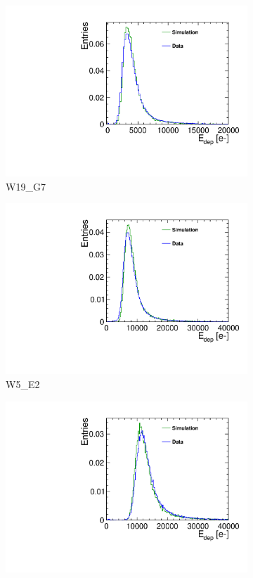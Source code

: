 \begin{figure}[htbp] \centering
  \begin{subfigure}[b]{0.3\textwidth}
    \includegraphics[width=\textwidth]{figures/TestBeam/50micron_Edep.pdf}
    \caption{W19\_G7}
  \end{subfigure} \hfill
  \begin{subfigure}[b]{0.3\textwidth}
    \includegraphics[width=\textwidth]{figures/TestBeam/100micron_Edep.pdf}
    \caption{W5\_E2}
  \end{subfigure} \hfill
  \begin{subfigure}[b]{0.3\textwidth}
    \includegraphics[width=\textwidth]{figures/TestBeam/150micron_Edep.pdf}

\end{subfigure}
\end{figure}
